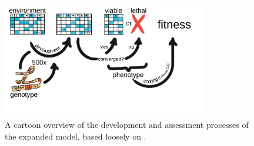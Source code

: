 \begin{figure}
    \centering
    \includegraphics[width=0.8\textwidth,trim={0 1.5cm 0 0.25cm},clip]{img/complete_schematic}
  	\caption{A cartoon overview of the development and assessment processes of the expanded model, based loosely on \cite{Wilder2015ReconcilingEvolvability}.}
    \label{fig:complete_schematic}
\end{figure}